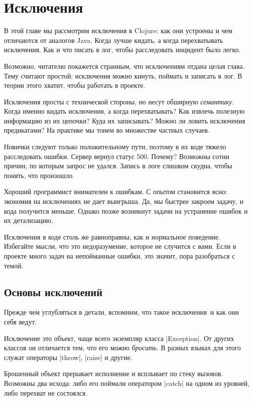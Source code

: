 \chapter{Исключения}

\begin{teaser}
В этой главе мы рассмотрим исключения в Clojure: как они устроены и чем
отличаются от аналогов Java. Когда лучше кидать, а когда перехватывать
исключения. Как и что писать в лог, чтобы расследовать инцидент было легко.
\end{teaser}

Возможно, читателю покажется странным, что исключениям отдана целая глава. Тему
считают простой: исключения можно кинуть, поймать и записать в лог. В теории
этого хватит, чтобы работать в проекте.

Исключения просты с технической стороны, но несут обширную
\emph{семантику}. Когда именно кидать исключения, а когда перехватывать? Как
извлечь полезную информацию из их цепочки? Куда их записывать? Можно ли ловить
исключения предикатами? На практике мы тонем во множестве частных случаев.

Новички следуют только положительному пути, поэтому в их коде тяжело
расследовать ошибки. Сервер вернул статус 500. Почему?  Возможны сотни причин,
по которым запрос не удался. Запись в логе слишком скудна, чтобы понять, что
произошло.

Хороший программист внимателен к ошибкам. С опытом становится ясно: экономия на
исключениях не дает выигрыша. Да, мы быстрее закроем задачу, и кода получится
меньше. Однако позже возникнут задачи на устранение ошибок и их детализацию.

Исключения в коде столь же равноправны, как и нормальное поведение. Избегайте
мысли, что это недоразумение, которое не случится с вами. Если в проекте много
задач на непойманные ошибки, это значит, пора разобраться с темой.

\section{Основы исключений}

Прежде чем углубляться в детали, вспомним, что такое исключения~и как они себя
ведут.

Исключение это объект, чаще всего экземпляр класса \spverb|Exception|. От других
классов он отличается тем, что его можно \emph{бросить}. В разных языках для
этого служат операторы \spverb|throw|, \spverb|raise| и другие.

Брошенный объект прерывает исполнение и всплывает по стеку вызовов. Возможны два
исхода: либо его поймали оператором \spverb|catch| на одном из уровней, либо
перехват не состоялся.

